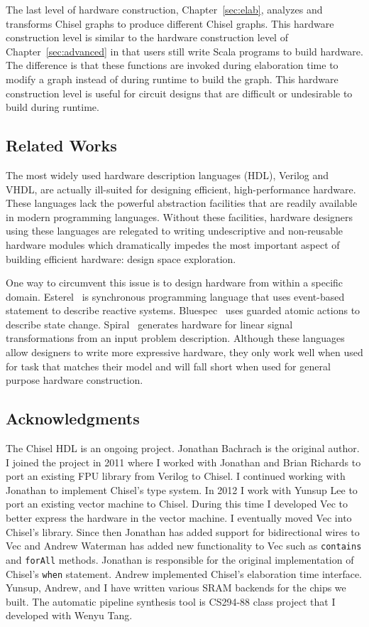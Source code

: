 The last level of hardware construction, Chapter~\ref{sec:elab},
analyzes and transforms Chisel graphs to produce different Chisel
graphs. This hardware construction level is similar to the hardware
construction level of Chapter~\ref{sec:advanced} in that users still
write Scala programs to build hardware. The difference is that these
functions are invoked during elaboration time to modify a graph
instead of during runtime to build the graph. This hardware
construction level is useful for circuit designs that are difficult or
undesirable to build during runtime.

\subsection{Related Works}
The most widely used hardware description languages (HDL), Verilog and VHDL,
are actually ill-suited for designing efficient, high-performance
hardware. These languages lack the powerful abstraction facilities
that are readily available in modern programming languages. Without
these facilities, hardware designers using these languages are
relegated to writing undescriptive and non-reusable hardware modules
which dramatically impedes the most important aspect of building
efficient hardware: design space exploration.

One way to circumvent this issue is to design hardware from within a
specific domain. Esterel~\cite{esterel} is synchronous programming
language that uses event-based statement to describe reactive
systems. Bluespec~\cite{bluespec} uses guarded atomic actions to
describe state change. Spiral~\cite{hoe:spiral} generates hardware
for linear signal transformations from an input problem
description. Although these languages allow designers to write more
expressive hardware, they only work well when used for task that
matches their model and will fall short when used for general purpose
hardware construction.

\subsection{Acknowledgments}
The Chisel HDL is an ongoing project. Jonathan Bachrach is the
original author. I joined the project in 2011 where I worked with
Jonathan and Brian Richards to port an existing FPU library from
Verilog to Chisel. I continued working with Jonathan to implement
Chisel's type system. In 2012 I work with Yunsup Lee to port an
existing vector machine to Chisel. During this time I developed Vec to
better express the hardware in the vector machine. I eventually moved
Vec into Chisel's library. Since then Jonathan has added support for
bidirectional wires to Vec and Andrew Waterman has added new
functionality to Vec such as {\tt contains} and {\tt forAll}
methods. Jonathan is responsible for the original implementation of
Chisel's {\tt when} statement. Andrew implemented Chisel's elaboration
time interface. Yunsup, Andrew, and I have written various SRAM
backends for the chips we built. The automatic pipeline synthesis tool
is CS294-88 class project that I developed with Wenyu Tang.
